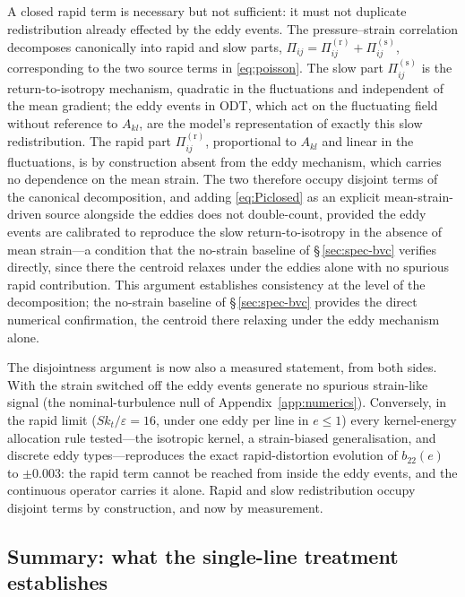 \documentclass[lineno]{JFM-FLM_Au}
\begin{document}
A closed rapid term is necessary but not sufficient: it must not duplicate
redistribution already effected by the eddy events. The pressure--strain
correlation decomposes canonically into rapid and slow parts,
$\Pi_{ij}=\Pi^{(\mathrm r)}_{ij}+\Pi^{(\mathrm s)}_{ij}$, corresponding to the two source terms in \eqref{eq:poisson}. The slow part
$\Pi^{(\mathrm s)}_{ij}$ is the return-to-isotropy mechanism, quadratic in the
fluctuations and independent of the mean gradient; the eddy events in ODT,
which act on the fluctuating field without reference to $A_{kl}$, are the
model's representation of exactly this slow redistribution. The rapid part
$\Pi^{(\mathrm r)}_{ij}$, proportional to $A_{kl}$ and linear in the
fluctuations, is by construction absent from the eddy mechanism, which carries
no dependence on the mean strain. The two therefore occupy disjoint terms of
the canonical decomposition, and adding \eqref{eq:Piclosed} as an explicit
mean-strain-driven source alongside the eddies does not double-count, provided
the eddy events are calibrated to reproduce the slow return-to-isotropy in the
absence of mean strain---a condition that the no-strain baseline of
\S\,\ref{sec:spec-bvc} verifies directly, since there the centroid relaxes
under the eddies alone with no spurious rapid contribution. This argument establishes consistency at the level of the decomposition; the no-strain baseline of \S\,\ref{sec:spec-bvc} provides the direct numerical confirmation, the centroid there relaxing under the eddy mechanism alone.

The disjointness argument is now also a measured statement, from both
sides. With the strain switched off the eddy events generate no spurious
strain-like signal (the nominal-turbulence null of
Appendix~\ref{app:numerics}). Conversely, in the rapid limit
($Sk_t/\varepsilon=16$, under one eddy per line in $e\le1$) every
kernel-energy allocation rule tested---the isotropic kernel, a
strain-biased generalisation, and discrete eddy types---reproduces the
exact rapid-distortion evolution of $b_{22}(e)$ to $\pm0.003$: the rapid
term cannot be reached from inside the eddy events, and the continuous
operator carries it alone. Rapid and slow redistribution occupy disjoint
terms by construction, and now by measurement.

\subsection{Summary: what the single-line treatment establishes}
\label{sec:gate-summary}
\end{document}

